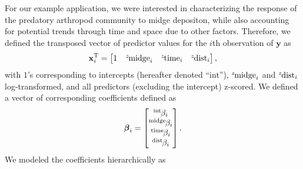 For our example application,
we were interested in characterizing the response of the predatory arthropod
community to midge depositon, while also accounting for potential trends through
time and space due to other factors.
Therefore, we defined the transposed vector of predictor values for the $i$th observation
of $\mathbf{y}$ as
%
\begin{equation} \label{eq:x-vec}
    \mathbf{x}_i^\text{T} = \begin{bmatrix}
        1 &
        {}^z\hspace*{-1pt}\text{midge}_i &
        {}^z\hspace*{-1pt}\text{time}_i &
        {}^z\hspace*{-1pt}\text{dist}_i
    \end{bmatrix}\text{,}
\end{equation}
%
\noindent with $1$'s corresponding to intercepts (hereafter denoted ``int''),
${}^z\hspace*{-1pt}\text{midge}_i$ and ${}^z\hspace*{-1pt}\text{dist}_i$ log-transformed,
and all predictors (excluding the intercept) z-scored.
We defined a vector of corresponding coefficients defined as
%
\begin{equation} \label{eq:beta-vec}
{\boldsymbol\beta}_i = \begin{bmatrix}
    {}^\text{int}\hspace*{-1pt}\beta_i \\
    {}^\text{midge}\hspace*{-1pt}\beta_i \\
    {}^\text{time}\hspace*{-1pt}\beta_i \\
    {}^\text{dist}\hspace*{-1pt}\beta_i
    \end{bmatrix}\text{.}
\end{equation}
%
\noindent We modeled the coefficients hierarchically \citep[following][]{Jackson2012} as
%
